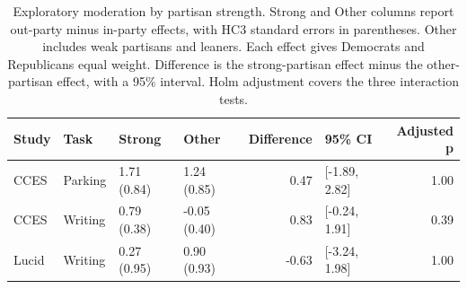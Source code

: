 \begin{table}[ht]
\centering
\caption{Exploratory moderation by partisan strength. Strong and Other columns report out-party minus in-party effects, with HC3 standard errors in parentheses. Other includes weak partisans and leaners. Each effect gives Democrats and Republicans equal weight. Difference is the strong-partisan effect minus the other-partisan effect, with a 95\% interval. Holm adjustment covers the three interaction tests.}
\label{tab:strength}
\begin{tabular}{llllrlr}
  \toprule
Study & Task & Strong & Other & Difference & 95\% CI & Adjusted p \\
  \midrule
CCES & Parking & 1.71 (0.84) & 1.24 (0.85) & 0.47 & [-1.89, 2.82] & 1.00 \\
  CCES & Writing & 0.79 (0.38) & -0.05 (0.40) & 0.83 & [-0.24, 1.91] & 0.39 \\
  Lucid & Writing & 0.27 (0.95) & 0.90 (0.93) & -0.63 & [-3.24, 1.98] & 1.00 \\
   \bottomrule
\end{tabular}
\end{table}
